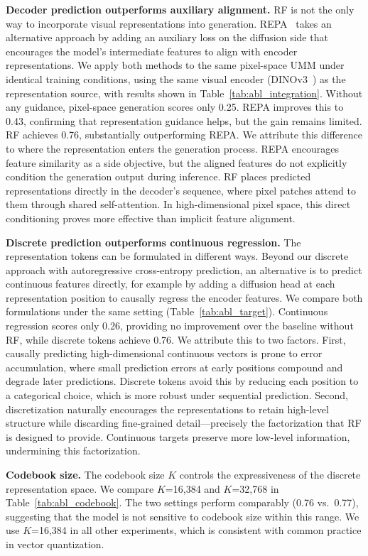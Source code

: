 \textbf{Decoder prediction outperforms auxiliary alignment.}
RF is not the only way to incorporate visual representations into
generation. REPA~\cite{repa} takes an alternative approach by
adding an auxiliary loss on the diffusion side that encourages the
model's intermediate features to align with encoder representations.
We apply both methods to the same pixel-space UMM under identical
training conditions, using the same visual encoder (DINOv3~\cite{dinov3}) as the
representation source, with results shown in
Table~\ref{tab:abl_integration}. Without any guidance, pixel-space
generation scores only 0.25. REPA improves this to 0.43, confirming
that representation guidance helps, but the gain remains limited.
RF achieves 0.76, substantially outperforming REPA. We attribute
this difference to where the representation enters the generation
process. REPA encourages feature similarity as a side objective,
but the aligned features do not explicitly condition the generation
output during inference. RF places predicted representations directly in the
decoder's sequence, where pixel patches attend to them through
shared self-attention. In high-dimensional pixel space, this direct
conditioning proves more effective than implicit feature
alignment.

\textbf{Discrete prediction outperforms continuous regression.}
The representation tokens can be formulated in different ways. Beyond our discrete approach with autoregressive cross-entropy prediction, an alternative is to predict continuous features directly, for example by adding a diffusion head at each representation position to causally regress the encoder features. We compare both formulations under the same setting (Table~\ref{tab:abl_target}). Continuous regression scores only 0.26, providing no improvement over the baseline without RF, while discrete tokens achieve 0.76. We attribute this to two factors. First, causally predicting high-dimensional continuous vectors is prone to error accumulation, where small prediction errors at early positions compound and degrade later predictions. Discrete tokens avoid this by reducing each position to a categorical choice, which is more robust under sequential prediction. Second, discretization naturally encourages the representations to retain high-level structure while discarding fine-grained detail---precisely the factorization that RF is designed to provide. Continuous targets preserve more low-level information, undermining this factorization.

\textbf{Codebook size.} The codebook size $K$ controls the expressiveness of the discrete representation space. We compare $K$=16,384 and $K$=32,768 in Table~\ref{tab:abl_codebook}. The two settings perform comparably (0.76 vs.\ 0.77), suggesting that the model is not sensitive to codebook size within this range. We use $K$=16,384 in all other experiments, which is consistent with common practice in vector quantization.

